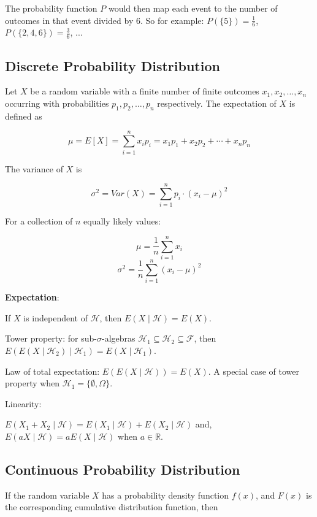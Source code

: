 \documentclass{article}
\begin{document}
The probability function \(P\) would then map each event to the number of outcomes in that event divided by 6. 
So for example: \(P(\{5\}) = \frac{1}{6}\), \(P(\{2, 4, 6\}) = \frac{3}{6}\), ...

\subsection{Discrete Probability Distribution}

Let \(X\) be a random variable with a finite number of finite outcomes \( x_{1},  x_{2}, \ldots, x_{n}\) occurring with probabilities \(p_{1}, p_{2}, \ldots, p_{n}\) respectively. The expectation of \(X\) is defined as

\[\mu = E[X] = \sum_{i=1}^{n}x_{i} p_{i} = x_{1} p_{1} + x_{2} p_{2} + \cdots  + x_{n} p_{n}\]

The variance of \(X\) is

\[\sigma^{2} = Var(X) = \sum_{i=1}^{n}p_{i} \cdot (x_{i} - \mu)^{2}\]

For a collection of \(n\) equally likely values:

\[\mu = \frac {1}{n} \sum_{i=1}^{n} x_{i}\]
\[\sigma^{2} = \frac {1}{n} \sum_{i=1}^{n} (x_{i} - \mu)^{2}\]

\textbf{Expectation}:

If \(X\) is independent of \(\mathcal{H}\), then \(E(X \mid \mathcal{H}) = E(X)\).

Tower property: for sub-\(\sigma\)-algebras \(\mathcal{H}_1 \subseteq \mathcal{H}_2 \subseteq \mathcal{F}\), then \(E(E(X \mid \mathcal{H}_2) \mid \mathcal{H}_1) = E(X \mid \mathcal{H}_1)\).

Law of total expectation: \(E(E(X \mid \mathcal{H})) = E(X)\). A special case of tower property when \(\mathcal{H}_1 = \{\emptyset, \Omega\}\).

Linearity:

\(E(X_{1}+X_{2}\mid {\mathcal {H}})=E(X_{1}\mid {\mathcal {H}})+E(X_{2}\mid {\mathcal {H}})\) and, 
\(E(aX \mid {\mathcal {H}}) = a E(X \mid {\mathcal {H}})\) when \(a \in \mathbb {R}\).

\subsection{Continuous Probability Distribution}

If the random variable \(X\) has a probability density function \(f(x)\), and \(F(x)\) is the corresponding cumulative distribution function, then
\end{document}
